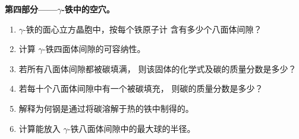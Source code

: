\begin{problem}
\medskip
\noindent\textbf{第四部分——$\gamma$-铁中的空穴。}
\begin{enumerate}[resume]
  \item $\gamma$-铁的面心立方晶胞中，按每个铁原子计
        含有多少个八面体间隙？
  \item 计算 $\gamma$-铁四面体间隙的可容纳性。
  \item 若所有八面体间隙都被碳填满，
        则该固体的化学式及碳的质量分数是多少？
  \item 若每十个八面体间隙中有一个被碳填充，
        则碳的质量分数是多少？
  \item 解释为何钢是通过将碳溶解于热的铁中制得的。
  \item 计算能放入
        $\gamma$-铁八面体间隙中的最大球的半径。
\end{enumerate}
\end{problem}
